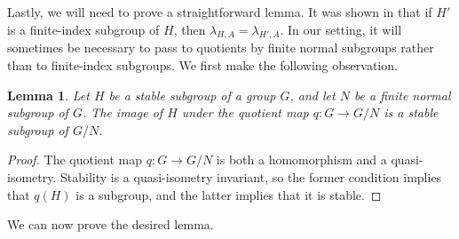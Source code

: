 \documentclass[10pt,a4paper]{amsart}
\newtheorem{lemma}[theorem]{Lemma}
\begin{document}
Lastly, we will need to prove a straightforward lemma. It was shown in \cite{CRSZ} that if $H'$ is a finite-index subgroup of $H$, then $\lambda_{H,A} = \lambda_{H',A}$. In our setting, it will sometimes be necessary to pass to quotients by finite normal subgroups rather than to finite-index subgroups. We first make the following observation.

\begin{lemma}
    Let $H$ be a stable subgroup of a group $G$, and let $N$ be a finite normal subgroup of $G$. The image of $H$ under the quotient map $q : G \rightarrow G/N$ is a stable subgroup of $G/N$.
\end{lemma} 
\begin{proof}
    The quotient map $q: G \rightarrow G/N$ is both a homomorphism and a quasi-isometry. Stability is a quasi-isometry invariant, so the former condition implies that $q(H)$ is a subgroup, and the latter implies that it is stable.
\end{proof}
We can now prove the desired lemma.
\end{document}
